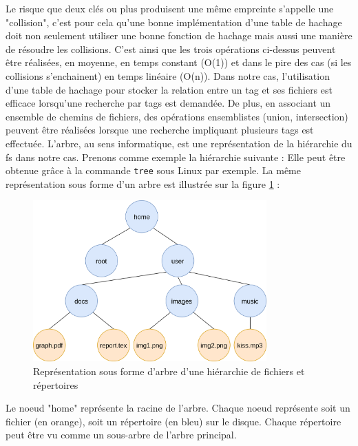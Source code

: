Le risque que deux clés ou plus produisent une même empreinte s'appelle une "collision", c'est 
pour cela qu'une bonne implémentation d'une table de hachage doit non seulement utiliser une bonne 
fonction de hachage mais aussi une manière de résoudre les collisions. C'est ainsi que les trois 
opérations ci-dessus peuvent être réalisées, en moyenne, en temps constant (O(1)) et dans le pire 
des cas (si les collisions s'enchainent) en temps linéaire (O(n)). Dans notre cas, l'utilisation 
d'une table de hachage pour stocker la relation entre un tag et ses fichiers est efficace lorsqu'une 
recherche par tags est demandée. De plus, en associant un ensemble de chemins de fichiers, 
des opérations ensemblistes (union, intersection) peuvent être réalisées lorsque une recherche 
impliquant plusieurs tags est effectuée.
\bigbreak
L'arbre, au sens informatique, est une représentation de la hiérarchie du \acrshort{fs} dans 
notre cas. Prenons comme exemple la hiérarchie suivante :
Elle peut être obtenue grâce à la commande \texttt{tree} sous Linux par exemple.
La même représentation sous forme d'un arbre est illustrée sur la figure \ref{tree} :
\begin{figure}
    \begin{center}
        \includegraphics[width=0.8\textwidth]{images/tree.png}
    \end{center}
    \caption{Représentation sous forme d'arbre d'une hiérarchie de fichiers et répertoires}
    \label{tree}
\end{figure}
Le noeud "home" représente la racine de l'arbre. Chaque noeud représente soit un fichier (en orange), soit 
un répertoire (en bleu) sur le disque. Chaque répertoire peut être vu comme un sous-arbre de l'arbre principal.
